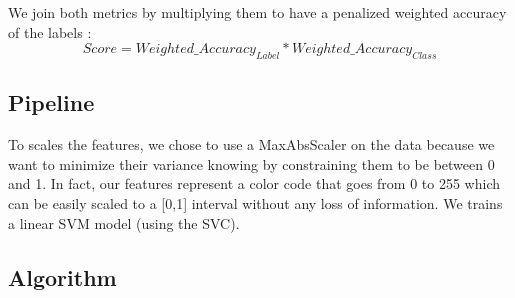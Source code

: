We join both metrics by multiplying them to have a penalized weighted accuracy of the labels : 
\begin{equation*}
	Score  = Weighted\_Accuracy_{Label} *  Weighted\_Accuracy_{Class}
\end{equation*}



\subsection{Pipeline}
To scales the features, we chose to use a MaxAbsScaler on the data because we want to minimize their variance knowing by constraining them to be between 0 and 1. In fact, our features represent a color code that goes from 0 to 255 which can be easily scaled to a [0,1] interval without any loss of information. We trains a linear SVM model (using the SVC). 

\subsection{Algorithm}
